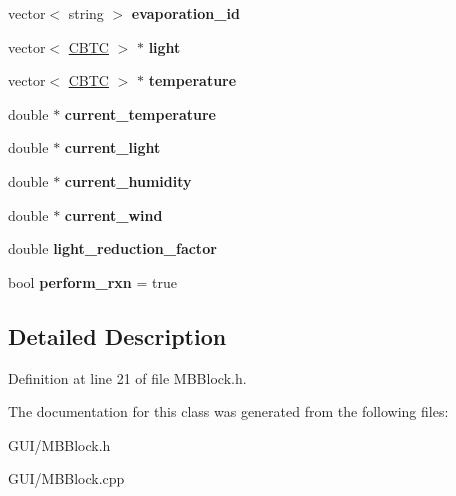 \begin{DoxyCompactItemize}
\item 
\mbox{\label{class_c_m_b_block_a5329b0689d005f11eb130d2e611faaf7}} 
vector$<$ string $>$ {\bfseries evaporation\+\_\+id}
\item 
\mbox{\label{class_c_m_b_block_a032d7496691f89c1cb46071ac42a367a}} 
vector$<$ \hyperlink{class_c_b_t_c}{C\+B\+TC} $>$ $\ast$ {\bfseries light}
\item 
\mbox{\label{class_c_m_b_block_a0327c2e58ad20bfa364f272f2a61654b}} 
vector$<$ \hyperlink{class_c_b_t_c}{C\+B\+TC} $>$ $\ast$ {\bfseries temperature}
\item 
\mbox{\label{class_c_m_b_block_a92429a492afc8df3aea764ddd46c7951}} 
double $\ast$ {\bfseries current\+\_\+temperature}
\item 
\mbox{\label{class_c_m_b_block_aa6a3c563436e075082415a9d16ed2d25}} 
double $\ast$ {\bfseries current\+\_\+light}
\item 
\mbox{\label{class_c_m_b_block_a221cddadee0569b382850ae096b843e1}} 
double $\ast$ {\bfseries current\+\_\+humidity}
\item 
\mbox{\label{class_c_m_b_block_afc35d1b41ab31b0edf39593111e7c266}} 
double $\ast$ {\bfseries current\+\_\+wind}
\item 
\mbox{\label{class_c_m_b_block_a32c2bb8260a82fbfe92eb628fa758219}} 
double {\bfseries light\+\_\+reduction\+\_\+factor}
\item 
\mbox{\label{class_c_m_b_block_a5448e4dc0d0b5d55a580d80478246ae0}} 
bool {\bfseries perform\+\_\+rxn} = true
\end{DoxyCompactItemize}


\subsection{Detailed Description}


Definition at line 21 of file M\+B\+Block.\+h.



The documentation for this class was generated from the following files\+:\begin{DoxyCompactItemize}
\item 
G\+U\+I/M\+B\+Block.\+h\item 
G\+U\+I/M\+B\+Block.\+cpp\end{DoxyCompactItemize}
